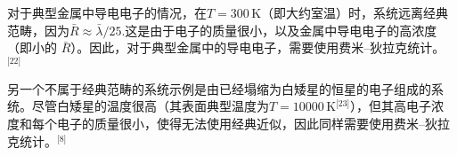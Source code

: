 对于典型金属中导电电子的情况，在\( T = 300 \, \text{K} \)（即大约室温）时，系统远离经典范畴，因为\(\bar{R}\approx\bar{\lambda}/25\).这是由于电子的质量很小，以及金属中导电电子的高浓度（即小的 \( \bar{R} \)）。因此，对于典型金属中的导电电子，需要使用费米–狄拉克统计。\(^\text{[22]}\)

另一个不属于经典范畴的系统示例是由已经塌缩为白矮星的恒星的电子组成的系统。尽管白矮星的温度很高（其表面典型温度为\( T = 10000 \, \text{K} \)\(^\text{[23]}\)），但其高电子浓度和每个电子的质量很小，使得无法使用经典近似，因此同样需要使用费米–狄拉克统计。\(^\text{[8]}\)